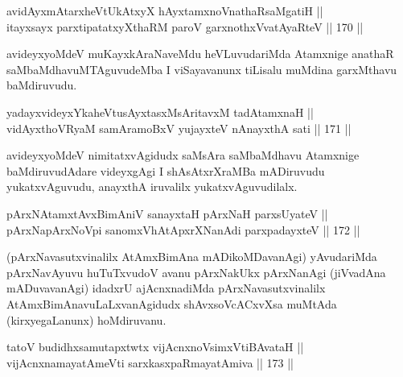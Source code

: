 \begin{shl}
avidAyxmAtarxheVtUkAtxyX hAyxtamxnoV\s nathaRsaMgatiH || \\
itayxsayx parxtipatatxyXthaRM paroV garxnothxV\s vatAyaRteV \hfill || 170 ||  
\end{shl}

\begin{artha}
avideyxyoMdeV muKayxkAraNaveMdu heVLuvudariMda Atamxnige anathaR
saMbaMdhavuMTAguvudeMba I viSayavanunx tiLisalu muMdina garxMthavu
baMdiruvudu.
\end{artha}


\begin{shl}
yadayxvideyxYkaheVtusAyxtasxMsAritavxM tadA\s \s tamxnaH ||  \\
vidAyxthoVR\s yaM samAramoBxV yujayxteV nAnayxthA sati \hfill || 171 ||  
\end{shl}

\begin{artha}
avideyxyoMdeV nimitatxvAgidudx saMsAra saMbaMdhavu Atamxnige
baMdiruvudAdare videyxgAgi I shAsAtxrXraMBa mADiruvudu yukatxvAguvudu,
anayxthA iruvalilx yukatxvAguvudilalx.
\end{artha}


\begin{shl}
pArxNAtamxtAvxBimAniV sanayxtaH pArxNaH parxsUyateV || \\
pArxNapArxNoV\s pi sanomxVhAtApxrXNanAdi parxpadayxteV \hfill || 172 ||  
\end{shl}

\begin{artha}
(pArxNavasutxvinalilx AtAmxBimAna mADikoMDavanAgi) yAvudariMda
pArxNavAyuvu huTuTxvudoV avanu pArxNakUkx pArxNanAgi (jiVvadAna
mADuvavanAgi) idadxrU ajAcnxnadiMda pArxNavasutxvinalilx
AtAmxBimAnavuLaLxvanAgidudx shAvxsoVcACxvXsa muMtAda
(kirxyegaLanunx) hoMdiruvanu.
\end{artha}


\begin{shl}
tatoV budidhxsamutapxtwtx vijAcnxnoV\s simxVtiBAvataH || \\
vijAcnxnamayatAmeVti sarxkasxpaRmayatAmiva \hfill || 173 ||  
\end{shl}

